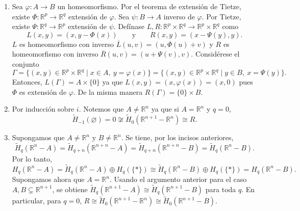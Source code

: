 \documentclass[11pt,a4paper]{article}
\theoremstyle{plain}
\theoremstyle{definition}
\theoremstyle{remark}
\newcommand{\RR}{\mathbb R}
\begin{document}
\begin{enumerate}[label=\arabic*.,leftmargin=*]
\begin{enumerate}[label=\alph*)]
Se tiene la sucesión de Mayer--Vietoris:
\[
\begin{aligned}
\cdots\to\tilde H_{q+1}(Z)\to\tilde H_q(Z_+\cap Z_-)\to\tilde H_q(Z_+)\oplus\tilde H_q(Z_-)&\to\tilde H_q(Z)\\
&\xrightarrow{\cong}\tilde H_{q-1}(Z_+\cap Z_-)\to0
\end{aligned}
\]
Por lo tanto, se sigue el isomorfismo
\[
\tilde H_q(\RR^{n+1}-A)\cong\tilde H_{q-1}\big((\RR^n-A)\times\RR\big)\cong\tilde H_{q-1}(\RR^n-A).
\]
\item Sea $\varphi:A\to B$ un homeomorfismo. Por el teorema de extensión
de Tietze, existe $\Phi:\RR^p\to\RR^q$ extensión de $\varphi$. Sea
$\psi:B\to A$ inverso de $\varphi$. Por Tietze, existe $\Psi:\RR^q\to\RR^p$
extensión de $\psi$. Defínase $L,R:\RR^p\times\RR^q\to\RR^p\times\RR^q$
como
\[
L(x,y)=(x,y-\Phi(x)) \qquad\text{y}\qquad R(x,y)=(x-\Psi(y),y).
\]
$L$ es homeomorfismo con inverso $\overline L(u,v)=(u,\Phi(u)+v)$ y $R$ es
homeomorfismo con inverso $\overline R(u,v)=(u+\Psi(v),v)$. Considérese el
conjunto
\[
\Gamma=\{(x,y)\in\RR^p\times\RR^q\mid x\in A,\ y=\varphi(x)\}=\{(x,y)\in\RR^p\times\RR^q\mid y\in B,\ x=\Psi(y)\}.
\]
Entonces, $L(\Gamma)=A\times\{0\}$ ya que $L(x,y)=(x,\varphi(x))=(x,0)$
pues $\Phi$ es extensión de $\varphi$. De la misma manera
$R(\Gamma)=\{0\}\times B$.
\item Por inducción sobre $i$. Notemos que $A\ne\RR^n$ ya que si
$A=\RR^n$ y $q=0$,
\[
\tilde H_{-1}(\varnothing)=0\not\cong\tilde H_0(\RR^{n+1}-\RR^n)\cong R.
\]
\item Supongamos que $A\ne\RR^n$ y $B\ne\RR^n$. Se tiene, por los incisos
anteriores,
\[
\tilde H_q(\RR^n-A)=\tilde H_{q+n}(\RR^{n+n}-A)=\tilde H_{q+n}(\RR^{n+n}-B)=\tilde H_q(\RR^n-B).
\]
Por lo tanto,
\[
H_q(\RR^n-A)=\tilde H_q(\RR^n-A)\oplus H_q(\{*\})\cong\tilde H_q(\RR^n-B)\oplus H_q(\{*\})=H_q(\RR^n-B).
\]
Supongamos ahora que $A=\RR^n$. Usando el argumento anterior para el caso
$A,B\subsetneq\RR^{n+1}$, se obtiene
$\tilde H_q(\RR^{n+1}-A)\cong\tilde H_q(\RR^{n+1}-B)$ para toda $q$. En
particular, para $q=0$,
$R\cong\tilde H_0(\RR^{n+1}-\RR^n)\cong\tilde H_0(\RR^{n+1}-B)$.


\end{enumerate}
\end{enumerate}
\end{document}
